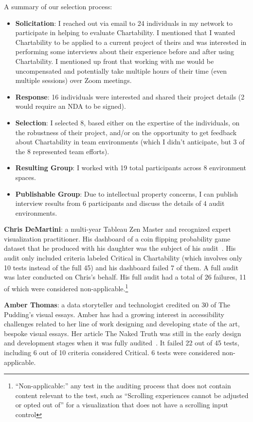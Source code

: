\documentclass[12pt]{cmuthesis}
\begin{document}
A summary of our selection process:
\begin{itemize}
    \item \textbf{Solicitation}: I reached out via email to 24 individuals in my network to participate in helping to evaluate Chartability. I mentioned that I wanted Chartability to be applied to a current project of theirs and was interested in performing some interviews about their experience before and after using Chartability. I mentioned up front that working with me would be uncompensated and potentially take multiple hours of their time (even multiple sessions) over Zoom meetings.
    \item \textbf{Response}: 16 individuals were interested and shared their project details (2 would require an NDA to be signed). 
    \item \textbf{Selection}: I selected 8, based either on the expertise of the individuals, on the robustness of their project, and/or on the opportunity to get feedback about Chartability in team environments (which I didn't anticipate, but 3 of the 8 represented team efforts).
    \item \textbf{Resulting Group}: I worked with 19 total participants across 8 environment spaces.
    \item \textbf{Publishable Group}: Due to intellectual property concerns, I can publish interview results from 6 participants and discuss the details of 4 audit environments.
\end{itemize}

\textbf{Chris DeMartini}: a multi-year Tableau Zen Master and recognized expert visualization practitioner. His dashboard of a coin flipping probability game dataset that he produced with his daughter was the subject of his audit~\cite{DeMartiniCoin}. His audit only included criteria labeled Critical in Chartability (which involves only 10 tests instead of the full 45) and his dashboard failed 7 of them. A full audit was later conducted on Chris’s behalf. His full audit had a total of 26 failures, 11 of which were considered non-applicable.\footnote{``Non-applicable:'' any test in the auditing process that does not contain content relevant to the test, such as ``Scrolling experiences cannot be adjusted or opted out of'' for a visualization that does not have a scrolling input control\label{fnlabel}}

\textbf{Amber Thomas}: a data storyteller and technologist credited on 30 of The Pudding's visual essays. Amber has had a growing interest in accessibility challenges related to her line of work designing and developing state of the art, bespoke visual essays. Her article The Naked Truth was still in the early design and development stages when it was fully audited~\cite{AmakaNaked}. It failed 22 out of 45 tests, including 6 out of 10 criteria considered Critical. 6 tests were considered non-applicable.
\end{document}
